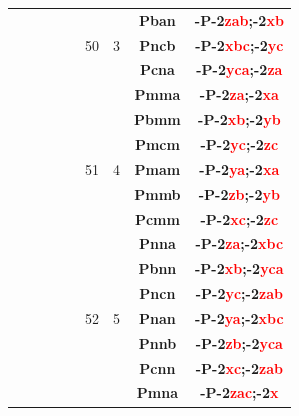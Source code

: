 \documentclass{article}      %
\begin{document}
\begin{small}
\begin{longtable}[c]{|c|c|c|c|c|c|c|c|c|}
          &  & & & &  & &\textbf{Pban}         &\textbf{-P-2\textcolor{red}{zab};-2\textcolor{red}{xb}}\\\cline{8-9}      
	  &  & & & &\textrm{50}  &\textrm{3} &\textbf{Pncb}         &\textbf{-P-2\textcolor{red}{xbc};-2\textcolor{red}{yc}}\\\cline{8-9}      
          &  & & & &  & &\textbf{Pcna}         &\textbf{-P-2\textcolor{red}{yca};-2\textcolor{red}{za}}\\\cline{6-9}    
          &  & & & &  & &\textbf{Pmma}         &\textbf{-P-2\textcolor{red}{za};-2\textcolor{red}{xa}}\\\cline{8-9}       
          &  & & & &  & &\textbf{Pbmm}         &\textbf{-P-2\textcolor{red}{xb};-2\textcolor{red}{yb}}\\\cline{8-9}       
          &  & & & &  & &\textbf{Pmcm}         &\textbf{-P-2\textcolor{red}{yc};-2\textcolor{red}{zc}}\\\cline{8-9}       
	  &  & & & &\textrm{51}  &\textrm{4} &\textbf{Pmam}         &\textbf{-P-2\textcolor{red}{ya};-2\textcolor{red}{xa}}\\\cline{8-9}       
          &  & & & &  & &\textbf{Pmmb}         &\textbf{-P-2\textcolor{red}{zb};-2\textcolor{red}{yb}}\\\cline{8-9}       
          &  & & & &  & &\textbf{Pcmm}         &\textbf{-P-2\textcolor{red}{xc};-2\textcolor{red}{zc}}\\\cline{6-9}       
          &  & & & &  & &\textbf{Pnna}         &\textbf{-P-2\textcolor{red}{za};-2\textcolor{red}{xbc}}\\\cline{8-9}      
          &  & & & &  & &\textbf{Pbnn}         &\textbf{-P-2\textcolor{red}{xb};-2\textcolor{red}{yca}}\\\cline{8-9}      
          &  & & & &  & &\textbf{Pncn}         &\textbf{-P-2\textcolor{red}{yc};-2\textcolor{red}{zab}}\\\cline{8-9}      
	  &  & & & &\textrm{52}  &\textrm{5} &\textbf{Pnan}         &\textbf{-P-2\textcolor{red}{ya};-2\textcolor{red}{xbc}}\\\cline{8-9}      
          &  & & & &  & &\textbf{Pnnb}         &\textbf{-P-2\textcolor{red}{zb};-2\textcolor{red}{yca}}\\\cline{8-9}      
          &  & & & &  & &\textbf{Pcnn}         &\textbf{-P-2\textcolor{red}{xc};-2\textcolor{red}{zab}}\\\cline{6-9}      
          &  & & & &  & &\textbf{Pmna}         &\textbf{-P-2\textcolor{red}{zac};-2\textcolor{red}{x}}\\\cline{8-9}       

\end{longtable}
\end{small}
\end{document}
